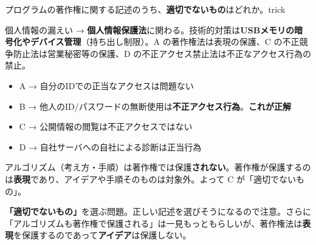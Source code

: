 \begin{mondai}{プログラムの著作権に関する記述のうち、\textbf{適切でないもの}はどれか。}{trick}
\end{mondai}

\kaitoupage


\begin{kaisetsu}
個人情報の漏えい → \textbf{個人情報保護法}に関わる。技術的対策は\textbf{USBメモリの暗号化やデバイス管理}（持ち出し制限）。A の著作権法は表現の保護、C の不正競争防止法は営業秘密等の保護、D の不正アクセス禁止法は不正なアクセス行為の禁止。
\end{kaisetsu}


\begin{goutoubun}
\begin{itemize}
  \item A → 自分のIDでの正当なアクセスは問題ない
  \item B → 他人のID/パスワードの無断使用は\textbf{不正アクセス行為}。\textbf{これが正解}
  \item C → 公開情報の閲覧は不正アクセスではない
  \item D → 自社サーバへの自社による診断は正当行為
\end{itemize}
\end{goutoubun}


\begin{kaisetsu}
アルゴリズム（考え方・手順）は著作権では保護\textbf{されない}。著作権が保護するのは\textbf{表現}であり、アイデアや手順そのものは対象外。よって C が「適切でないもの」。
\end{kaisetsu}

\begin{trickwarn}
\textbf{「適切でないもの」}を選ぶ問題。正しい記述を選びそうになるので注意。さらに「アルゴリズムも著作権で保護される」は一見もっともらしいが、著作権法は\textbf{表現}を保護するのであって\textbf{アイデア}は保護しない。
\end{trickwarn}



\mondaipage
{}

